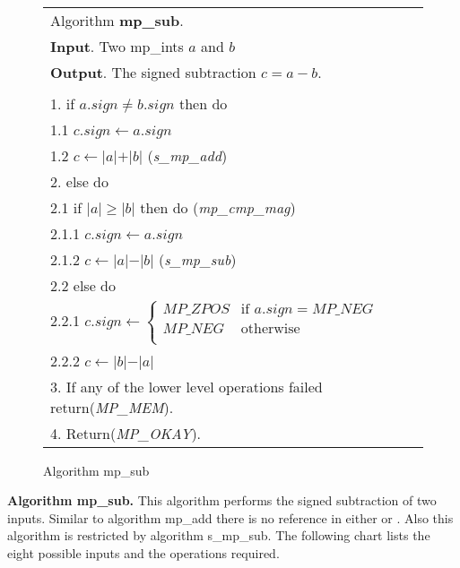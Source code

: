 \documentclass[b5paper]{book}
\begin{document}
\newpage\begin{figure}[!here]
\begin{center}
\begin{tabular}{l}
\hline Algorithm \textbf{mp\_sub}. \\
\textbf{Input}.   Two mp\_ints $a$ and $b$  \\
\textbf{Output}.  The signed subtraction $c = a - b$. \\
\hline \\
1.  if $a.sign \ne b.sign$ then do \\
\hspace{3mm}1.1  $c.sign \leftarrow a.sign$ \\
\hspace{3mm}1.2  $c \leftarrow \vert a \vert + \vert b \vert$ (\textit{s\_mp\_add}) \\
2.  else do \\
\hspace{3mm}2.1  if $\vert a \vert \ge \vert b \vert$ then do (\textit{mp\_cmp\_mag}) \\
\hspace{6mm}2.1.1  $c.sign \leftarrow a.sign$ \\
\hspace{6mm}2.1.2  $c \leftarrow \vert a \vert  - \vert b \vert$ (\textit{s\_mp\_sub}) \\
\hspace{3mm}2.2  else do \\
\hspace{6mm}2.2.1  $c.sign \leftarrow  \left \lbrace \begin{array}{ll}
                              MP\_ZPOS &  \mbox{if }a.sign = MP\_NEG \\
                              MP\_NEG  &  \mbox{otherwise} \\
                              \end{array} \right .$ \\
\hspace{6mm}2.2.2  $c \leftarrow \vert b \vert  - \vert a \vert$ \\
3.  If any of the lower level operations failed return(\textit{MP\_MEM}). \\
4.  Return(\textit{MP\_OKAY}). \\
\hline
\end{tabular}
\end{center}
\caption{Algorithm mp\_sub}
\end{figure}

\textbf{Algorithm mp\_sub.}
This algorithm performs the signed subtraction of two inputs.  Similar to algorithm mp\_add there is no reference in either \cite{TAOCPV2} or 
\cite{HAC}.  Also this algorithm is restricted by algorithm s\_mp\_sub.  The following chart lists the eight possible inputs and
the operations required.
\end{document}
